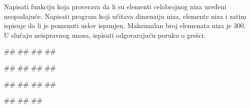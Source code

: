 \begin{Exercise}[label=neopadajuce]
  Napisati funkciju koja proverava da li su elementi celobrojnog niza
  uređeni neopadajuće. 
  Napisati program koji učitava dimenziju niza, elemente niza i zatim ispisuje
  da li je pomenuti uslov ispunjen. 
  Maksimalan broj elemenata niza je $300$.
U slučaju neispravnog unosa, ispisati odgovarajuću poruku o grešci. 

\begin{miditest}
\begin{upotreba}{1}
#\naslovInt#
##
##
##  
\end{upotreba}
\end{miditest}
\begin{miditest}
\begin{upotreba}{2}
#\naslovInt#
##
##
##  
\end{upotreba}
\end{miditest}

\begin{miditest}
\begin{upotreba}{3}
#\naslovInt#
##
##
##  
\end{upotreba}
\end{miditest}
\begin{miditest}
\begin{upotreba}{4}
#\naslovInt#
##
##  
\end{upotreba}
\end{miditest}

\end{Exercise}

\ifresenja
\begin{Answer}[ref=neopadajuce]
\end{Answer}
\fi


